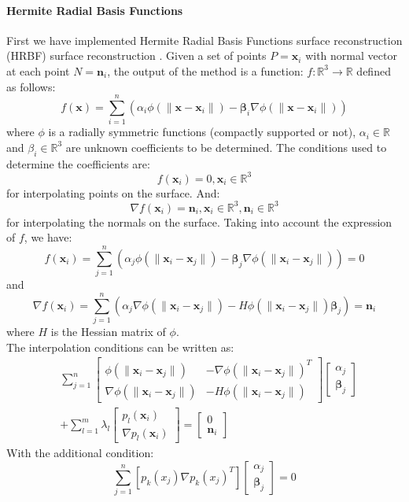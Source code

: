 \documentclass[ams]{U-AizuGT}
\def\x{\mathbf{x}}
\def\R{\mathbb{R}}
\def\n{\mathbf{n}}
\def\bbeta{\boldsymbol\beta}
\begin{document}
\paragraph{Hermite Radial Basis Functions}
First we have implemented Hermite Radial Basis Functions surface reconstruction (HRBF) 
surface reconstruction \cite{MGV11}. 
Given a set of points $P = {\x_i}$ with normal vector at each point $N = {\n_i}$, 
the output of the method is a function: $f : \R^3 \to \R$ defined as follows:
\[
f(\x)=\sum_{i=1}^n(\alpha_i\phi(\|\x-\x_i\|)-\bbeta_i\nabla\phi(\|\x-\x_i\|))
\]
where $\phi$ is a radially symmetric functions (compactly supported or not), 
$\alpha_i \in \R$ and $\beta_i \in \R^3$ are unknown coefficients to be determined. 
The conditions used to determine the coefficients are: \[f(\x_i) = 0, \x_i \in \R^3\]
for interpolating points on the surface. And: \[\nabla f(\x_i)=\n_i, \x_i \in \R^3, \n_i \in \R^3\]
for interpolating the normals on the surface.
Taking into account the expression of $f$, we have:
\[f(\x_i)=\sum_{j=1}^n(\alpha_j\phi(\|\x_i-\x_j\|)-\bbeta_j\nabla\phi(\|\x_i-\x_j\|))=0\]
and
\[\nabla f(\x_i)=\sum_{j=1}^n(\alpha_j\nabla\phi(\|\x_i-\x_j\|)-H\phi(\|\x_i-\x_j\|)\bbeta_j)=\n_i\]
where $H$ is the Hessian matrix of $\phi$.
\\
The interpolation conditions can be written as:
\begin{align} \label{hrbf1}
 & \sum_{j=1}^n
\begin{bmatrix}
\phi(\|\x_i-\x_j\|) & -\nabla\phi(\|\x_i-\x_j\|)^T\\ \nabla\phi(\|\x_i-\x_j\|) & -H\phi(\|\x_i-\x_j\|)
\end{bmatrix}
\begin{bmatrix}
\alpha_j\\\bbeta_j
\end{bmatrix} \nonumber
\\
 & + \sum_{l=1}^m\lambda_l
\begin{bmatrix}
p_l(\x_i)\\\nabla p_l(\x_i)
\end{bmatrix}
=
\begin{bmatrix}
0 \\ \n_i
\end{bmatrix}
\end{align}
With the additional condition:
\begin{equation} \label{hrbfcond}
\sum_{j=1}^n[p_k(x_j)\nabla p_k(x_j)^T]\begin{bmatrix}\alpha_j\\\bbeta_j\end{bmatrix}=0
\end{equation}
\end{document}
